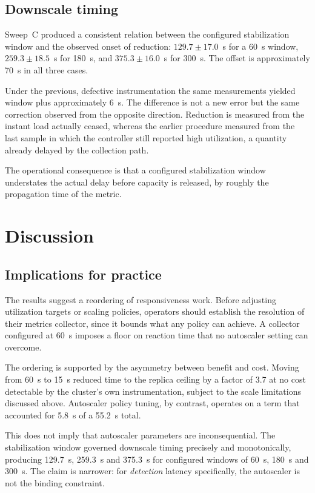 \documentclass[conference]{IEEEtran}
\begin{document}
\subsection{Downscale timing}

Sweep~C produced a consistent relation between the configured stabilization
window and the observed onset of reduction: $129.7 \pm 17.0$~s for a 60~s
window, $259.3 \pm 18.5$~s for 180~s, and $375.3 \pm 16.0$~s for 300~s. The
offset is approximately 70~s in all three cases.

Under the previous, defective instrumentation the same measurements yielded
window plus approximately 6~s. The difference is not a new error but the same
correction observed from the opposite direction. Reduction is measured from the
instant load actually ceased, whereas the earlier procedure measured from the
last sample in which the controller still reported high utilization, a quantity
already delayed by the collection path.

The operational consequence is that a configured stabilization window
understates the actual delay before capacity is released, by roughly the
propagation time of the metric.

\section{Discussion}

\subsection{Implications for practice}

The results suggest a reordering of responsiveness work. Before adjusting
utilization targets or scaling policies, operators should establish the
resolution of their metrics collector, since it bounds what any policy can
achieve. A collector configured at 60~s imposes a floor on reaction time that no
autoscaler setting can overcome.

The ordering is supported by the asymmetry between benefit and cost. Moving from
60~s to 15~s reduced time to the replica ceiling by a factor of 3.7 at no cost
detectable by the cluster's own instrumentation, subject to the scale
limitations discussed above. Autoscaler policy tuning, by contrast, operates on
a term that accounted for 5.8~s of a 55.2~s total.

This does not imply that autoscaler parameters are inconsequential. The
stabilization window governed downscale timing precisely and monotonically,
producing 129.7~s, 259.3~s and 375.3~s for configured windows of 60~s, 180~s and
300~s. The claim is narrower: for \emph{detection} latency specifically, the
autoscaler is not the binding constraint.
\end{document}

